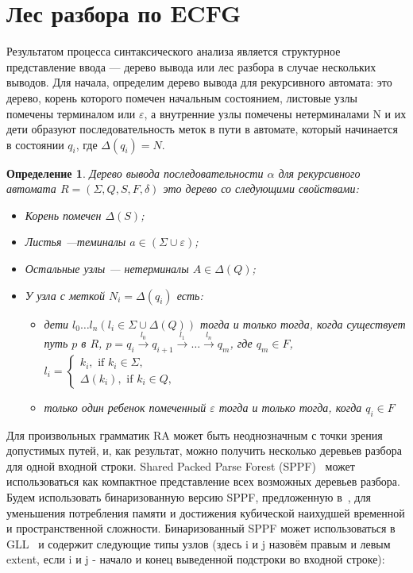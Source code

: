 \documentclass[14pt]{matmex-diploma-custom}
\newtheorem{mydef}{Определение}
\begin{document}
	\section{Лес разбора по ECFG}
	Результатом процесса синтаксического анализа является структурное представление 
	ввода --- дерево вывода или лес разбора в случае нескольких выводов.
	Для начала, определим дерево вывода для рекурсивного автомата: 
	это дерево, корень которого помечен начальным состоянием, листовые узлы помечены
	терминалом или $\varepsilon$, а внутренние узлы помечены нетерминалами N и их
	дети образуют последовательность меток в пути в автомате, который начинается в 
	состоянии $q_i$, где $ \Delta(q_i) = N $.
	
	\begin{mydef}
		
		Дерево вывода последовательности $\alpha$ для рекурсивного автомата $R=(\Sigma, Q, S, F, \delta)$ это дерево со следующими свойствами:
		
		\begin{itemize}
			\item Корень помечен $\Delta(S)$;
			\item Листья ---теминалы $a\in (\Sigma \cup \varepsilon)$;
			\item Остальные узлы --- нетерминалы $A\in \Delta(Q)$;
			\item У узла с меткой $N_i = \Delta(q_i)$ есть:
			\begin{itemize}
				\item 
				дети $l_0 \dots l_n (l_i \in \Sigma \cup \Delta(Q))$ тогда и только тогда,
				когда существует путь $p$ в $R$, $p = q_i \xrightarrow[]{l_0} q_{i+1} \xrightarrow[]{l_1} \dots \xrightarrow{l_n} q_m$, где
				$q_m \in F$, $l_i = 
				\left\{
				\begin{matrix}
				k_i, \text{ if }  k_i \in \Sigma,\\
				\Delta(k_i), \text{ if } k_i \in Q,
				\end{matrix}
				\right.
				$
				\item только один ребенок помеченный $\varepsilon$ тогда и только тогда,
				когда $ q_i \in F $
			\end{itemize}
		\end{itemize}
	\end{mydef}
	Для произвольных грамматик RA может быть неоднозначным с точки зрения допустимых путей,
	и, как результат, можно получить несколько деревьев разбора для одной входной строки.
	Shared Packed Parse Forest (SPPF)~\cite{SPPF} может использоваться как компактное
	представление всех возможных деревьев разбора. Будем использовать бинаризованную версию SPPF,
	предложенную в~\cite{brnglr}, для уменьшения потребления памяти и достижения кубической
	наихудшей временной и пространственной сложности. Бинаризованный SPPF может использоваться
	в GLL~\cite{scott2013gll} и содержит следующие типы узлов (здесь i и j назовём правым и
	левым extent, если i и j - начало и конец выведенной подстроки во входной строке):
	
\end{document}
